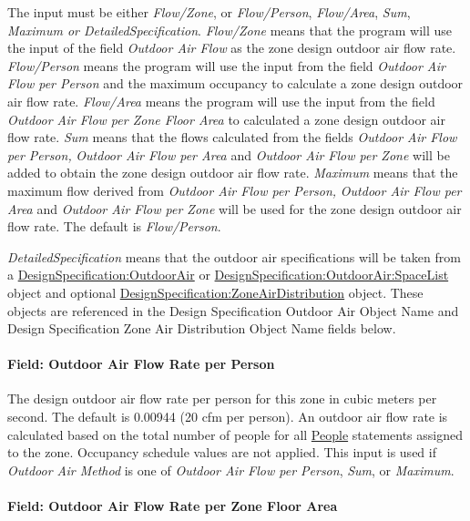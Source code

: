 The input must be either \emph{Flow/Zone}, or \emph{Flow/Person}, \emph{Flow/Area}, \emph{Sum}, \emph{Maximum or DetailedSpecification}. \emph{Flow/Zone} means that the program will use the input of the field \emph{Outdoor Air Flow} as the zone design outdoor air flow rate. \emph{Flow/Person} means the program will use the input from the field \emph{Outdoor Air Flow per Person} and the maximum occupancy to calculate a zone design outdoor air flow rate. \emph{Flow/Area} means the program will use the input from the field \emph{Outdoor Air Flow per Zone Floor Area} to calculated a zone design outdoor air flow rate. \emph{Sum} means that the flows calculated from the fields \emph{Outdoor Air Flow per Person,} \emph{Outdoor Air Flow per Area} and \emph{Outdoor Air Flow per Zone} will be added to obtain the zone design outdoor air flow rate. \emph{Maximum} means that the maximum flow derived from \emph{Outdoor Air Flow per Person,} \emph{Outdoor Air Flow per Area} and \emph{Outdoor Air Flow per Zone} will be used for the zone design outdoor air flow rate. The default is \emph{Flow/Person}.

\emph{DetailedSpecification} means that the outdoor air specifications will be taken from a \hyperref[designspecificationoutdoorair]{DesignSpecification:OutdoorAir} or \hyperref[designspecificationoutdoorairspacelist]{DesignSpecification:OutdoorAir:SpaceList} object and optional \hyperref[designspecificationzoneairdistribution]{DesignSpecification:ZoneAirDistribution} object. These objects are referenced in the Design Specification Outdoor Air Object Name and Design Specification Zone Air Distribution Object Name fields below.

\paragraph{Field: Outdoor Air Flow Rate per Person}\label{field-outdoor-air-flow-rate-per-person-5}

The design outdoor air flow rate per person for this zone in cubic meters per second. The default is 0.00944 (20 cfm per person). An outdoor air flow rate is calculated based on the total number of people for all \hyperref[people]{People} statements assigned to the zone. Occupancy schedule values are not applied. This input is used if \emph{Outdoor Air Method} is one of \emph{Outdoor Air Flow per Person}, \emph{Sum}, or \emph{Maximum}.

\paragraph{Field: Outdoor Air Flow Rate per Zone Floor Area}\label{field-outdoor-air-flow-rate-per-zone-floor-area-5}

